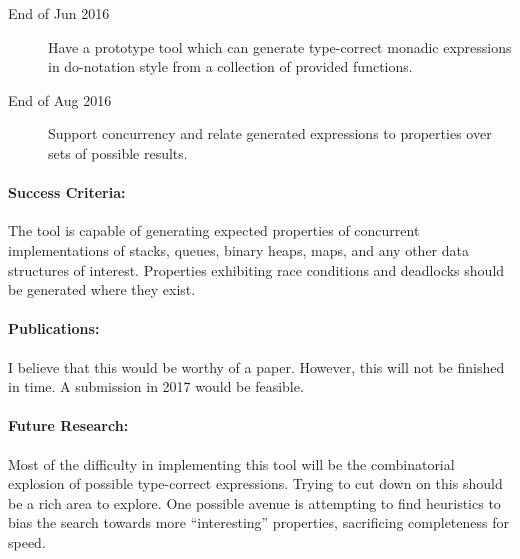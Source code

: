 \begin{description}
\item[End of Jun 2016] Have a prototype tool which can generate
  type-correct monadic expressions in do-notation style from a
  collection of provided functions.

\item[End of Aug 2016] Support concurrency and relate generated
  expressions to properties over sets of possible results.
\end{description}

\paragraph{Success Criteria:}

The tool is capable of generating expected properties of concurrent
implementations of stacks, queues, binary heaps, maps, and any other
data structures of interest. Properties exhibiting race conditions and
deadlocks should be generated where they exist.

\paragraph{Publications:}

I believe that this would be worthy of a paper. However, this will not
be finished in time. A submission in 2017 would be feasible.

\paragraph{Future Research:}

Most of the difficulty in implementing this tool will be the
combinatorial explosion of possible type-correct expressions. Trying
to cut down on this should be a rich area to explore. One possible
avenue is attempting to find heuristics to bias the search towards
more ``interesting'' properties, sacrificing completeness for speed.
